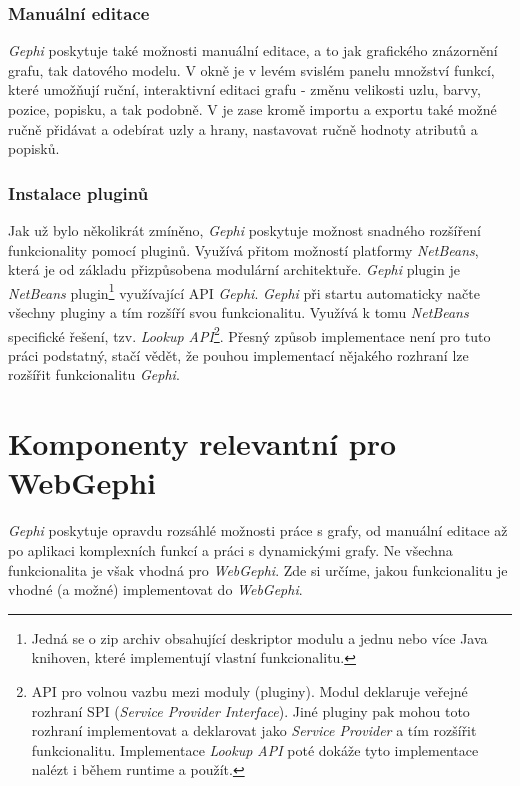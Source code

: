 \documentclass[thesis=M,czech]{FITthesis}[2014/05/6]
\begin{document}
\subsubsection{Manuální editace}
\textit{Gephi} poskytuje také možnosti manuální editace, a to jak grafického znázornění grafu, tak datového modelu. V okně  je v levém svislém panelu množství funkcí, které 
umožňují ruční, interaktivní editaci grafu - změnu velikosti uzlu, barvy, pozice, popisku, a tak podobně. V  je zase kromě importu a exportu také možné ručně přidávat a odebírat
uzly a hrany, nastavovat ručně hodnoty atributů a popisků.

\subsubsection{Instalace pluginů}\label{part:instalace-pluginu}
Jak už bylo několikrát zmíněno, \textit{Gephi} poskytuje možnost snadného rozšíření funkcionality pomocí pluginů. Využívá přitom možností platformy \textit{NetBeans},
která je od základu přizpůsobena modulární architektuře. \textit{Gephi} plugin je \textit{NetBeans} plugin\footnote{Jedná se o zip archiv obsahující deskriptor modulu a jednu 
nebo více Java knihoven, které implementují vlastní funkcionalitu.} využívající API \textit{Gephi}. \textit{Gephi} při startu automaticky načte všechny pluginy a tím rozšíří 
svou funkcionalitu. Využívá k tomu \textit{NetBeans} specifické řešení, tzv. \textit{Lookup API}\footnote{API pro volnou vazbu mezi moduly (pluginy). 
Modul deklaruje veřejné rozhraní SPI (\textit{Service Provider Interface}). Jiné pluginy pak mohou toto rozhraní implementovat
a deklarovat jako \textit{Service Provider} a tím rozšířit funkcionalitu. Implementace \textit{Lookup API} poté dokáže tyto implementace nalézt i během runtime a použít.}.  
Přesný způsob implementace není pro tuto práci podstatný, stačí vědět, že pouhou implementací nějakého rozhraní lze rozšířit funkcionalitu \textit{Gephi}. 
 
\section{Komponenty relevantní pro WebGephi}
\textit{Gephi} poskytuje opravdu rozsáhlé možnosti práce s grafy, od manuální editace až po aplikaci komplexních funkcí a práci s dynamickými grafy.
Ne všechna funkcionalita je však vhodná pro \textit{WebGephi}. Zde si určíme, jakou funkcionalitu je vhodné (a možné) implementovat do \textit{WebGephi}.
\end{document}
